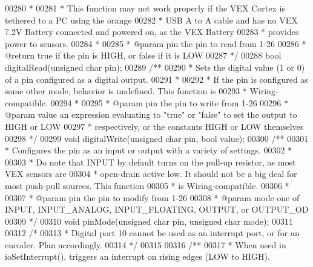 \begin{DoxyCode}
00280 \textcolor{comment}{ *}
00281 \textcolor{comment}{ * This function may not work properly if the VEX Cortex is tethered to a PC using the orange}
00282 \textcolor{comment}{ * USB A to A cable and has no VEX 7.2V Battery connected and powered on, as the VEX Battery}
00283 \textcolor{comment}{ * provides power to sensors.}
00284 \textcolor{comment}{ *}
00285 \textcolor{comment}{ * @param pin the pin to read from 1-26}
00286 \textcolor{comment}{ * @return true if the pin is HIGH, or false if it is LOW}
00287 \textcolor{comment}{ */}
00288 \textcolor{keywordtype}{bool} digitalRead(\textcolor{keywordtype}{unsigned} \textcolor{keywordtype}{char} pin);
00289 \textcolor{comment}{/**}
00290 \textcolor{comment}{ * Sets the digital value (1 or 0) of a pin configured as a digital output.}
00291 \textcolor{comment}{ *}
00292 \textcolor{comment}{ * If the pin is configured as some other mode, behavior is undefined. This function is}
00293 \textcolor{comment}{ * Wiring-compatible.}
00294 \textcolor{comment}{ *}
00295 \textcolor{comment}{ * @param pin the pin to write from 1-26}
00296 \textcolor{comment}{ * @param value an expression evaluating to "true" or "false" to set the output to HIGH or LOW}
00297 \textcolor{comment}{ * respectively, or the constants HIGH or LOW themselves}
00298 \textcolor{comment}{ */}
00299 \textcolor{keywordtype}{void} digitalWrite(\textcolor{keywordtype}{unsigned} \textcolor{keywordtype}{char} pin, \textcolor{keywordtype}{bool} value);
00300 \textcolor{comment}{/**}
00301 \textcolor{comment}{ * Configures the pin as an input or output with a variety of settings.}
00302 \textcolor{comment}{ *}
00303 \textcolor{comment}{ * Do note that INPUT by default turns on the pull-up resistor, as most VEX sensors are}
00304 \textcolor{comment}{ * open-drain active low. It should not be a big deal for most push-pull sources. This function}
00305 \textcolor{comment}{ * is Wiring-compatible.}
00306 \textcolor{comment}{ *}
00307 \textcolor{comment}{ * @param pin the pin to modify from 1-26}
00308 \textcolor{comment}{ * @param mode one of INPUT, INPUT\_ANALOG, INPUT\_FLOATING, OUTPUT, or OUTPUT\_OD}
00309 \textcolor{comment}{ */}
00310 \textcolor{keywordtype}{void} pinMode(\textcolor{keywordtype}{unsigned} \textcolor{keywordtype}{char} pin, \textcolor{keywordtype}{unsigned} \textcolor{keywordtype}{char} mode);
00311 
00312 \textcolor{comment}{/*}
00313 \textcolor{comment}{ * Digital port 10 cannot be used as an interrupt port, or for an encoder. Plan accordingly.}
00314 \textcolor{comment}{ */}
00315 
00316 \textcolor{comment}{/**}
00317 \textcolor{comment}{ * When used in ioSetInterrupt(), triggers an interrupt on rising edges (LOW to HIGH).}

\end{DoxyCode}
